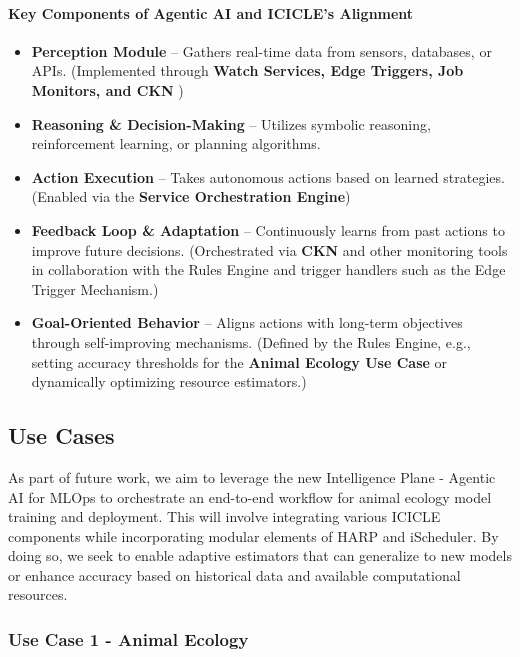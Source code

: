 \paragraph{Key Components of Agentic AI and ICICLE’s Alignment}
\begin{itemize}
    \item \textbf{Perception Module} – Gathers real-time data from sensors, databases, or APIs. (Implemented through \textbf{Watch Services, Edge Triggers, Job Monitors, and CKN} \cite{withana2023ckn})
    \item \textbf{Reasoning \& Decision-Making} – Utilizes symbolic reasoning, reinforcement learning, or planning algorithms.
    \item \textbf{Action Execution} – Takes autonomous actions based on learned strategies. (Enabled via the \textbf{Service Orchestration Engine})
    \item \textbf{Feedback Loop \& Adaptation} – Continuously learns from past actions to improve future decisions. (Orchestrated via \textbf{CKN} and other monitoring tools in collaboration with the Rules Engine and trigger handlers such as the Edge Trigger Mechanism.)
    \item \textbf{Goal-Oriented Behavior} – Aligns actions with long-term objectives through self-improving mechanisms. (Defined by the Rules Engine, e.g., setting accuracy thresholds for the \textbf{Animal Ecology Use Case} or dynamically optimizing resource estimators.)
\end{itemize}


\subsection{Use Cases}

As part of future work, we aim to leverage the new Intelligence Plane - Agentic AI for MLOps to orchestrate an end-to-end workflow for animal ecology model training and deployment. This will involve integrating various ICICLE components while incorporating modular elements of HARP and iScheduler. By doing so, we seek to enable adaptive estimators that can generalize to new models or enhance accuracy based on historical data and available computational resources.



\subsubsection{Use Case 1 - Animal Ecology}

